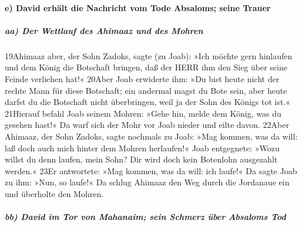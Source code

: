 \hypertarget{e-david-erhuxe4lt-die-nachricht-vom-tode-absaloms-seine-trauer}{%
\paragraph{e) David erhält die Nachricht vom Tode Absaloms; seine
Trauer}\label{e-david-erhuxe4lt-die-nachricht-vom-tode-absaloms-seine-trauer}}

\hypertarget{aa-der-wettlauf-des-ahimaaz-und-des-mohren}{%
\subparagraph{aa) Der Wettlauf des Ahimaaz und des
Mohren}\label{aa-der-wettlauf-des-ahimaaz-und-des-mohren}}

19Ahimaaz aber, der Sohn Zadoks, sagte (zu Joab): »Ich möchte gern
hinlaufen und dem König die Botschaft bringen, daß der HERR ihm den Sieg
über seine Feinde verliehen hat!« 20Aber Joab erwiderte ihm: »Du bist
heute nicht der rechte Mann für diese Botschaft; ein andermal magst du
Bote sein, aber heute darfst du die Botschaft nicht überbringen, weil ja
der Sohn des Königs tot ist.« 21Hierauf befahl Joab seinem Mohren: »Gehe
hin, melde dem König, was du gesehen hast!« Da warf sich der Mohr vor
Joab nieder und eilte davon. 22Aber Ahimaaz, der Sohn Zadoks, sagte
nochmals zu Joab: »Mag kommen, was da will: laß doch auch mich hinter
dem Mohren herlaufen!« Joab entgegnete: »Wozu willst du denn laufen,
mein Sohn? Dir wird doch kein Botenlohn ausgezahlt werden.« 23Er
antwortete: »Mag kommen, was da will: ich laufe!« Da sagte Joab zu ihm:
»Nun, so laufe!« Da schlug Ahimaaz den Weg durch die Jordanaue ein und
überholte den Mohren.

\hypertarget{bb-david-im-tor-von-mahanaim-sein-schmerz-uxfcber-absaloms-tod}{%
\subparagraph{bb) David im Tor von Mahanaim; sein Schmerz über Absaloms
Tod}\label{bb-david-im-tor-von-mahanaim-sein-schmerz-uxfcber-absaloms-tod}}

